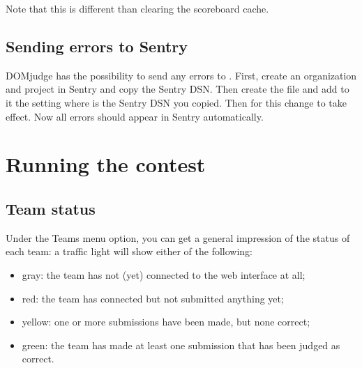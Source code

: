 \documentclass[a4paper,10pt,english,openany]{sphinxmanual}
\begin{document}
\begin{sphinxVerbatim}[commandchars=\\\{\}]
 
\end{sphinxVerbatim}

\sphinxAtStartPar
Note that this is different than clearing the scoreboard cache.


\subsection{Sending errors to Sentry}
\label{\detokenize{config-advanced:sending-errors-to-sentry}}
\sphinxAtStartPar
DOMjudge has the possibility to send any errors to . First, create an
organization and project in Sentry and copy the Sentry DSN. Then create the file
 and add to it the setting  where
 is the Sentry DSN you copied. Then {\hyperref[\detokenize{config-advanced:clear-cache}]{}}
for this change to take effect. Now all errors should appear in Sentry
automatically.

\sphinxstepscope


\section{Running the contest}
\label{\detokenize{running:running-the-contest}}\label{\detokenize{running::doc}}

\subsection{Team status}
\label{\detokenize{running:team-status}}
\sphinxAtStartPar
Under the Teams menu option, you can get a general impression of the
status of each team: a traffic light will show either of the
following:
\begin{itemize}
\item {} 
\sphinxAtStartPar
gray: the team has not (yet) connected to the web interface at all;

\item {} 
\sphinxAtStartPar
red: the team has connected but not submitted anything yet;

\item {} 
\sphinxAtStartPar
yellow: one or more submissions have been made, but none correct;

\item {} 
\sphinxAtStartPar
green: the team has made at least one submission that has
been judged as correct.

\end{itemize}
\end{document}
